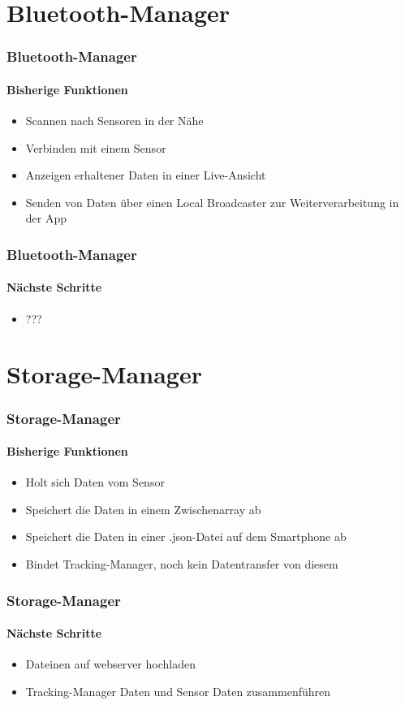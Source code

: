 \documentclass{beamer}
\begin{document}

\section{Bluetooth-Manager}


\begin{frame}
\frametitle{Bluetooth-Manager}
\framesubtitle{Bisherige Funktionen}
\begin{itemize}
  \item Scannen nach Sensoren in der N\"ahe
  \item Verbinden mit einem Sensor
  \item Anzeigen erhaltener Daten in einer Live-Ansicht
  \item Senden von Daten \"uber einen Local Broadcaster zur Weiterverarbeitung in der App
\end{itemize}
\end{frame}

\begin{frame}
\frametitle{Bluetooth-Manager}
\framesubtitle{N\"achste Schritte}
\begin{itemize}
  \item ???
\end{itemize}
\end{frame}


\section{Storage-Manager}



\begin{frame}
\frametitle{Storage-Manager}
\framesubtitle{Bisherige Funktionen}
\begin{itemize}
  \item Holt sich Daten vom Sensor
  \item Speichert die Daten in einem Zwischenarray ab
  \item Speichert die Daten in einer .json-Datei auf dem Smartphone ab
  \item Bindet Tracking-Manager, noch kein Datentransfer von diesem
\end{itemize}
\end{frame}

\begin{frame}
\frametitle{Storage-Manager}
\framesubtitle{N\"achste Schritte}
\begin{itemize}
  \item Dateinen auf webserver hochladen
  \item Tracking-Manager Daten und Sensor Daten zusammenf\"uhren
\end{itemize}
\end{frame}
\end{document}
